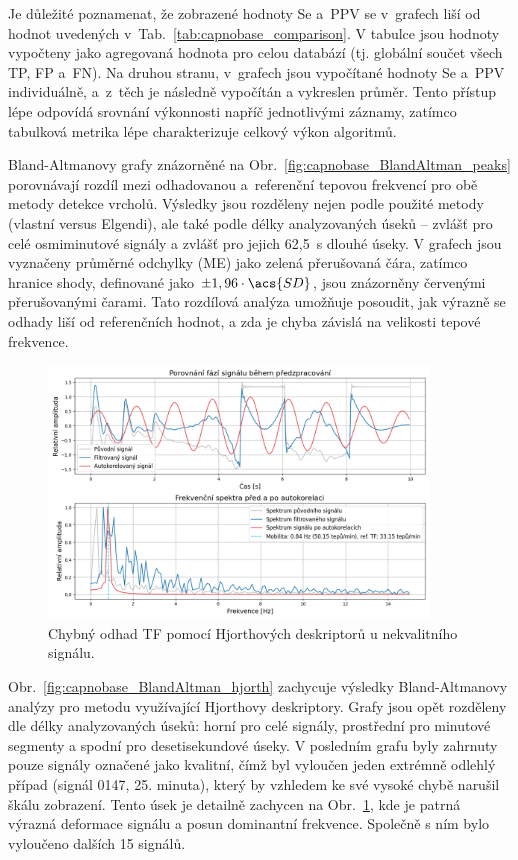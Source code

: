 Je důležité poznamenat, že zobrazené hodnoty \acs{Se} a~\acs{PPV} se v~grafech liší od hodnot uvedených v~Tab.~\ref{tab:capnobase_comparison}.
V tabulce jsou hodnoty vypočteny jako agregovaná hodnota pro celou databází (tj. globální součet všech \acs{TP}, \acs{FP} a~\acs{FN}).
Na druhou stranu, v~grafech jsou vypočítané hodnoty \acs{Se} a~\acs{PPV} individuálně, a~z~těch je následně vypočítán a vykreslen průměr.
Tento přístup lépe odpovídá srovnání výkonnosti napříč jednotlivými záznamy, zatímco tabulková metrika lépe charakterizuje celkový výkon algoritmů.

Bland-Altmanovy grafy znázorněné na Obr.~\ref{fig:capnobase_BlandAltman_peaks} porovnávají rozdíl mezi odhadovanou a~referenční tepovou frekvencí pro obě metody detekce vrcholů.
Výsledky jsou rozděleny nejen podle použité metody (vlastní versus Elgendi), ale také podle délky analyzovaných úseků -- zvlášť pro celé osmiminutové signály a zvlášť pro jejich 62,5~s dlouhé úseky.
V grafech jsou vyznačeny průměrné odchylky (\acs{ME}) jako zelená přerušovaná čára, zatímco hranice shody, definované jako $\pm1,96 \cdot \acs{SD}$, jsou znázorněny červenými přerušovanými čarami.
Tato rozdílová analýza umožňuje posoudit, jak výrazně se odhady liší od referenčních hodnot, a zda je chyba závislá na velikosti tepové frekvence.

\begin{figure}[!bh]
	\centering
	\includegraphics[width=0.9\textwidth]{./obrazky/vysledky/hjorth_preprocess_diffHR.png}
	\caption[Chybný odhad \acs{TF} pomocí Hjorthových deskriptorů u nekvalitního signálu]{Chybný odhad TF pomocí Hjorthových deskriptorů u nekvalitního signálu.}
	\label{fig:capnobase_hjorth_err}
\end{figure}

Obr.~\ref{fig:capnobase_BlandAltman_hjorth} zachycuje výsledky Bland-Altmanovy analýzy pro metodu využívající Hjorthovy deskriptory.
Grafy jsou opět rozděleny dle délky analyzovaných úseků: horní pro celé signály, prostřední pro minutové segmenty a spodní pro desetisekundové úseky.
V posledním grafu byly zahrnuty pouze signály označené jako kvalitní, čímž byl vyloučen jeden extrémně odlehlý případ (signál 0147, 25. minuta), který by vzhledem ke své vysoké chybě narušil škálu zobrazení.
Tento úsek je detailně zachycen na Obr.~\ref{fig:capnobase_hjorth_err}, kde je patrná výrazná deformace signálu a posun dominantní frekvence.
Společně s ním bylo vyloučeno dalších 15 signálů.

